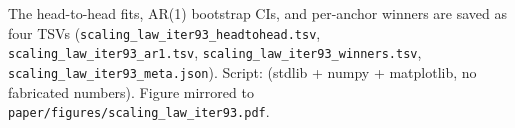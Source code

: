 The head-to-head fits, AR(1) bootstrap CIs, and per-anchor winners are
saved as four TSVs (\texttt{scaling\_law\_iter93\_headtohead.tsv},
\texttt{scaling\_law\_iter93\_ar1.tsv},
\texttt{scaling\_law\_iter93\_winners.tsv},
\texttt{scaling\_law\_iter93\_meta.json}).  Script:
 (stdlib + numpy +
matplotlib, no fabricated numbers).  Figure mirrored to
\texttt{paper/figures/scaling\_law\_iter93.pdf}.
